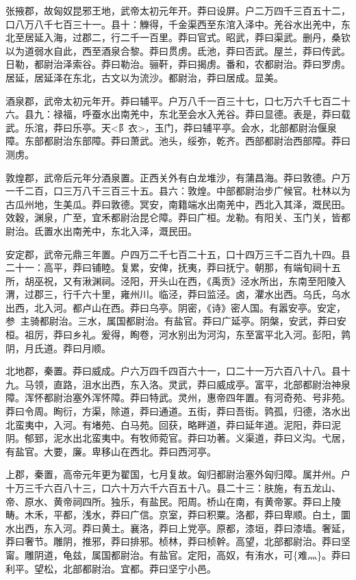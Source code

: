 \documentclass[]{article}
\begin{document}
张掖郡，故匈奴昆邪王地，武帝太初元年开。莽曰设屏。户二万四千三百五十二，口八万八千七百三十一。县十：觻得，千金渠西至东涫入泽中。羌谷水出羌中，东北至居延入海，过郡二，行二千一百里。莽曰官式。昭武，莽曰渠武。删丹，桑钦以为道弱水自此，西至酒泉合黎。莽曰贯虏。氐池，莽曰否武。屋兰，莽曰传武。日勒，都尉治泽索谷。莽曰勒治。骊靬，莽曰揭虏。番和，农都尉治。莽曰罗虏。居延，居延泽在东北，古文以为流沙。都尉治，莽曰居成。显美。

酒泉郡，武帝太初元年开。莽曰辅平。户万八千一百三十七，口七万六千七百二十六。县九：禄福，呼蚕水出南羌中，东北至会水入羌谷。莽曰显德。表是，莽曰载武。乐涫，莽曰乐亭。天\textless{}阝衣\textgreater{}，玉门，莽曰辅平亭。会水，北部都尉治偃泉障。东部都尉治东部障。莽曰萧武。池头，绥弥，乾齐。西部都尉治西部障。莽曰测虏。

敦煌郡，武帝后元年分酒泉置。正西关外有白龙堆沙，有蒲昌海。莽曰敦德。户万一千二百，口三万八千三百三十五。县六：敦煌。中部都尉治步广候官。杜林以为古瓜州地，生美瓜。莽曰敦德。冥安，南籍端水出南羌中，西北入其泽，溉民田。效穀，渊泉，广至，宜禾都尉治昆仑障。莽曰广桓。龙勒。有阳关、玉门关，皆都尉治。氐置水出南羌中，东北入泽，溉民田。

安定郡，武帝元鼎三年置。户四万二千七百二十五，口十四万三千二百九十四。县二十一：高平，莽曰铺睦。复累，安俾，抚夷，莽曰抚宁。朝那，有端旬祠十五所，胡巫祝，又有湫渊祠。泾阳，开头山在西，《禹贡》泾水所出，东南至阳陵入渭，过郡三，行千六十里，雍州川。临泾，莽曰监泾。卤，灈水出西。乌氏，乌水出西，北入河。都卢山在西。莽曰乌亭。阴密，《诗》密人国。有嚣安亭。安定，参，主骑都尉治。三水，属国都尉治。有盐官。莽曰广延亭。阴槃，安武，莽曰安桓。祖厉，莽曰乡礼。爰得，眴卷，河水别出为河沟，东至富平北入河。彭阳，鹑阴，月氏道。莽曰月顺。

北地郡，秦置。莽曰威成。户六万四千四百六十一，口二十一万六百八十八。县十九。马领，直路，沮水出西，东入洛。灵武，莽曰威成亭。富平，北部都尉治神泉障。浑怀都尉治塞外浑怀障。莽曰特武。灵州，惠帝四年置。有河奇苑、号非苑。莽曰令周。眴衍，方渠，除道，莽曰通道。五街，莽曰吾街。鹑孤，归德，洛水出北蛮夷中，入河。有堵苑、白马苑。回获，略畔道，莽曰延年道。泥阳，莽曰泥阴。郁郅，泥水出北蛮夷中。有牧师菀官。莽曰功著。义渠道，莽曰义沟。弋居，有盐官。大要，廉。卑移山在西北。莽曰西河亭。

上郡，秦置，高帝元年更为翟国，七月复故。匈归都尉治塞外匈归障。属并州。户十万三千六百八十三，口六十万六千六百五十八。县二十三：肤施，有五龙山、帝、原水、黄帝祠四所。独乐，有盐民。阳周。桥山在南，有黄帝冢。莽曰上陵畴。木禾，平都，浅水，莽曰广信。京室，莽曰积粟。洛都，莽曰卑顺。白土，圜水出西，东入河。莽曰黄土。襄洛，莽曰上党亭。原都，漆垣，莽曰漆墙。奢延，莽曰奢节。雕阴，推邪，莽曰排邪。桢林，莽曰桢幹。高望，北部都尉治。莽曰坚甯。雕阴道，龟兹，属国都尉治。有盐官。定阳，高奴，有洧水，可\{难灬\}。莽曰利平。望松，北部都尉治。宜都。莽曰坚宁小邑。
\end{document}
